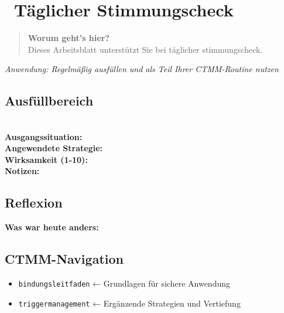 
\section*{\textcolor{ctmmGreen}{\faEdit~Täglicher Stimmungscheck}}

\begin{quote}
\textbf{\textcolor{ctmmGreen}{Worum geht's hier?}}\\
Dieses Arbeitsblatt unterstützt Sie bei täglicher stimmungscheck.
\end{quote}

\textit{Anwendung: Regelmäßig ausfüllen und als Teil Ihrer CTMM-Routine nutzen}

\subsection*{\textcolor{ctmmGreen}{Ausfüllbereich}}

\begin{ctmmGreenBox}[title=Täglicher Stimmungscheck Dokumentation]

 \quad {}\\[0.3cm]

\textbf{Ausgangssituation:} \\[0.3cm]

\textbf{Angewendete Strategie:} \\[0.3cm]

\textbf{Wirksamkeit (1-10):} \\[0.5cm]

\textbf{Notizen:}\\
\end{ctmmGreenBox}

\subsection*{\textcolor{ctmmPurple}{Reflexion}}
\textbf{Was war heute anders:}\\

\subsection*{\textcolor{ctmmBlue}{CTMM-Navigation}}
\begin{itemize}
  \item \texttt{bindungsleitfaden} ← Grundlagen für sichere Anwendung
  \item \texttt{triggermanagement} ← Ergänzende Strategien und Vertiefung
\end{itemize}